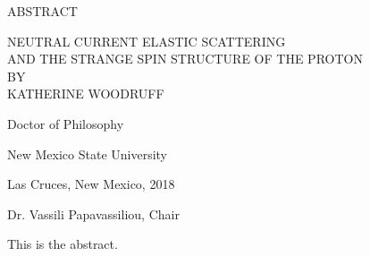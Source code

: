 \begin{center}
ABSTRACT
\end{center}
\vspace{0.3in}
\begin{center}
NEUTRAL CURRENT ELASTIC SCATTERING \\ AND THE STRANGE SPIN STRUCTURE OF THE PROTON
\\
BY
\\
KATHERINE WOODRUFF
\end{center}
\vspace{0.3in}
\begin{center}
Doctor of Philosophy

New Mexico State University

Las Cruces, New Mexico, 2018

Dr. Vassili Papavassiliou, Chair
\end{center}
\vspace{0.3in}
\hspace{\parindent}
This is the abstract.

\newpage
